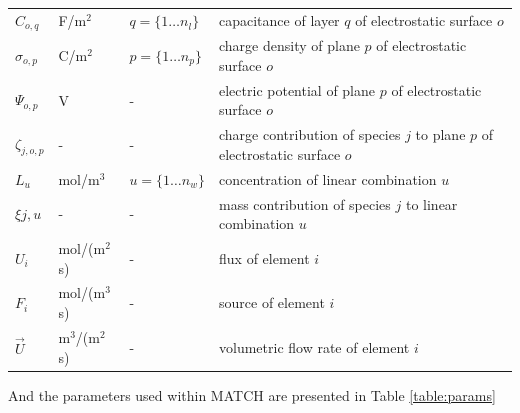 \documentclass{article}
\begin{document}
\begin{table}[H]
\begin{tabular}{l|l|l|l}
$C_{o,q}$       & F/m$^2$                   & $q = \{1 \ldots n_l\}$    & capacitance of layer $q$ of electrostatic surface $o$        \\
$\sigma_{o,p}$  & C/m$^2$                   & $p = \{1 \ldots n_p\}$    & charge density of plane $p$ of electrostatic surface $o$        \\
$\Psi_{o,p}$    & V                         & -                         & electric potential of plane $p$ of electrostatic surface $o$        \\
$\zeta_{j,o,p}$ & -                         & -                         & charge contribution of species $j$ to plane $p$ of electrostatic surface $o$ \\
$L_{u}$         & mol/m$^3$                 & $u = \{1 \ldots n_w\}$    & concentration of linear combination $u$ \\
$\xi{j,u}$      & -                         & -                         & mass contribution of species $j$ to linear combination $u$ \\
$U_i$           & mol/(m$^2$s)              & -                         & flux of element $i$\\
$F_i$           & mol/(m$^3$s)              & -                         & source of element $i$\\
$\vec{U}$       & m$^3$/(m$^2$s)            & -                         & volumetric flow rate of element $i$\\
\bottomrule
\end{tabular}
\end{table}

And the parameters used within MATCH are presented in Table \ref{table:params}
\end{document}
